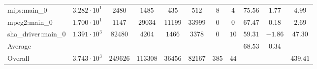 \begin{tabular}{|l|c|c|c|c|c|c|c|c|c|c|}
mips:main\_0            & $ 3.282 \cdot 10^{1} $ & $ 2480   $ & $ 1485   $ & $ 435   $ & $ 512   $ & $ 8   $ & $ 4  $ & $ 75.56       $ & $ 1.77    $ & $ 4.99    $ \\
mpeg2:main\_0           & $ 1.700 \cdot 10^{1} $ & $ 1147   $ & $ 29034  $ & $ 11199 $ & $ 33999 $ & $ 0   $ & $ 0  $ & $ 67.47       $ & $ 0.18    $ & $ 2.69    $ \\
sha\_driver:main\_0     & $ 1.391 \cdot 10^{3} $ & $ 82480  $ & $ 4204   $ & $ 1466  $ & $ 3378  $ & $ 0   $ & $ 10 $ & $ 59.31       $ & $ -1.86   $ & $ 47.30   $ \\
\hline
Average                 & $                    $ & $        $ & $        $ & $       $ & $       $ & $     $ & $    $ & $ 68.53       $ & $ 0.34    $ & $         $ \\
\hline
Overall                 & $ 3.743 \cdot 10^{3} $ & $ 249626 $ & $ 113308 $ & $ 36456 $ & $ 82167 $ & $ 385 $ & $ 44 $ & $             $ & $         $ & $ 439.41  $ \\
\hline
\end{tabular}

